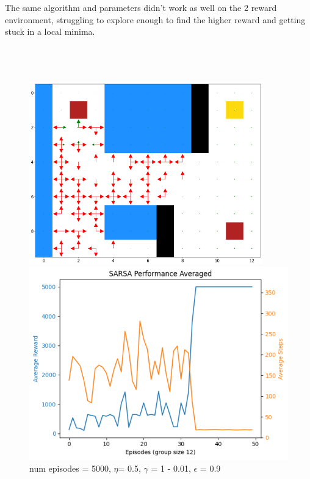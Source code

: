 \documentclass[12pt]{article}
\begin{document}
The same algorithm and parameters didn’t work as well on the 2 reward environment, struggling to explore enough to find the higher reward and getting stuck in a local minima. 
\\ \\ \\ \\

\begin{figure}
  \centering
\begin{minipage}{.28\textwidth}
  \includegraphics[width=0.9\textwidth]{4 Q plot.png}
  \caption{  num episodes = 5000, $\eta$= 0.5, $\gamma$ = 1 - 0.01, $\epsilon$ = 0.9}
\end{minipage}%
\begin{minipage}{.32\textwidth}
  \centering
  \includegraphics[width=1\textwidth]{10 performance plot.png}
\end{minipage}
\end{figure}
\end{document}
